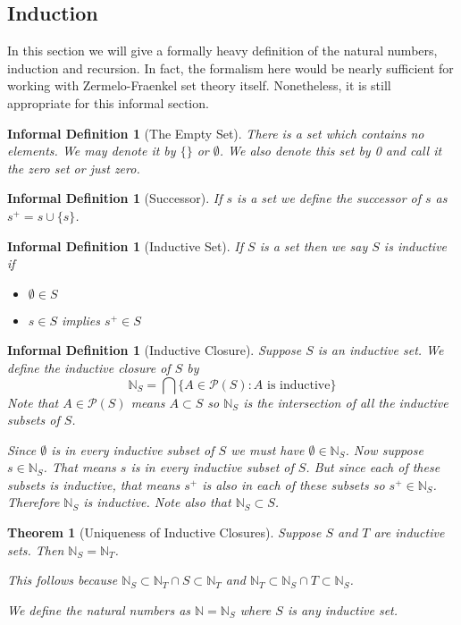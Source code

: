 \documentclass[12pt]{article}
\theoremstyle{break}
\theoremstyle{break}
\newtheorem{theorem}{Theorem}[section]
\theoremstyle{break}
\theoremstyle{break}
\theoremstyle{break}
\newtheorem{informal definition}[definition]{Informal Definition}
\newcommand{\mc}[1]{\mathcal{#1}}
\begin{document}
\subsection{Induction}

In this section we will give a formally heavy definition of the natural numbers, induction and recursion.
In fact, the formalism here would be nearly sufficient for working with Zermelo-Fraenkel set theory itself.
Nonetheless, it is still appropriate for this informal section.

\begin{informal definition}[The Empty Set]
There is a set which contains no elements.
We may denote it by $\{\}$ or $\emptyset$.
We also denote this set by 0 and call it the zero set or just zero.
\end{informal definition}

\begin{informal definition}[Successor]
If $s$ is a set we define the successor of $s$ as $s^+ = s \cup \{s\}$.
\end{informal definition}

\begin{informal definition}[Inductive Set]
If $S$ is a set then we say $S$ is inductive if
\begin{itemize}
\item{$\emptyset\in S$}
\item{$s \in S$ implies $s^+\in S$}
\end{itemize}
\end{informal definition}

\begin{informal definition}[Inductive Closure]
Suppose $S$ is an inductive set.
We define the inductive closure of $S$ by
$$
\mathbb{N}_S = \bigcap \{A \in \mc{P}(S): A \text{ is inductive}\}
$$
Note that $A \in \mc{P}(S)$ means $A \subset S$ so $\mathbb{N}_S$ is the intersection of all the inductive subsets of $S$.

Since $\emptyset$ is in every inductive subset of $S$ we must have $\emptyset \in \mathbb{N}_S$.
Now suppose $s\in \mathbb{N}_S$.
That means $s$ is in every inductive subset of $S$.
But since each of these subsets is inductive, that means $s^+$ is also in each of these subsets so $s^+\in \mathbb{N}_S$.
Therefore $\mathbb{N}_S$ is inductive.
Note also that $\mathbb{N}_S \subset S$.
\end{informal definition}

\begin{theorem}[Uniqueness of Inductive Closures]
\label{thm:uniqueindclosure}
Suppose $S$ and $T$ are inductive sets.
Then $\mathbb{N}_S = \mathbb{N}_T$.

This follows because $\mathbb{N}_S \subset \mathbb{N}_T \cap S \subset \mathbb{N}_T$ and $\mathbb{N}_T \subset \mathbb{N}_S \cap T \subset \mathbb{N}_S$.

We define the natural numbers as $\mathbb{N} = \mathbb{N}_S$ where $S$ is any inductive set.
\end{theorem}
\end{document}
